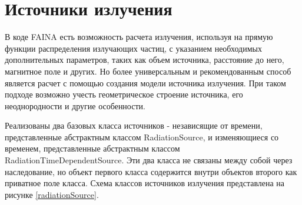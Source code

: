 \section{Источники излучения}

В коде FAINA есть возможность расчета излучения, используя на прямую функции распределения излучающих частиц, с указанием необходимых дополнительных параметров, таких как объем источника, расстояние до него, магнитное поле и других. Но более универсальным и рекомендованным способ является расчет с помощью создания модели источника излучения. При таком подходе возможно учесть геометрическое строение источника, его неоднородности и другие особенности.

Реализованы два базовых класса источников - независящие от времени, представленные абстрактным классом RadiationSource, и изменяющиеся со временем, представленные абстрактным классом RadiationTimeDependentSource. Эти два класса не связаны между собой через наследование, но объект первого класса содержится внутри объектов второго как приватное поле класса. Схема классов источников излучения представлена на рисунке \ref{radiationSource}.

